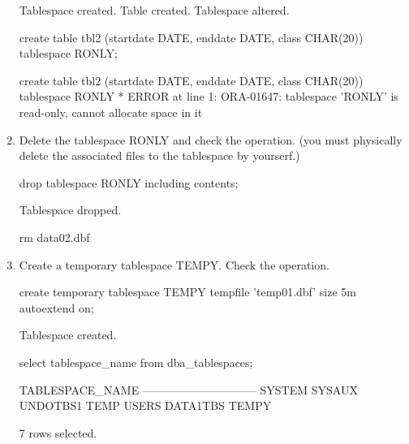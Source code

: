 \documentclass{article}
\begin{document}
\begin{enumerate}
\begin{messageshell}
Tablespace created.
Table created.
Tablespace altered.
\end{messageshell}
\begin{sqlshell}
create table tbl2 (startdate DATE, enddate DATE, class CHAR(20)) tablespace RONLY;
\end{sqlshell}
\begin{messageshell}
create table tbl2 (startdate DATE, enddate DATE, class CHAR(20)) tablespace RONLY
*
ERROR at line 1:
ORA-01647: tablespace 'RONLY' is read-only, cannot allocate space in it

\end{messageshell}
\item{Delete the tablespace RONLY and check the operation. (you must physically delete the associated files to the tablespace by yourserf.)}
\begin{sqlshell}
drop tablespace RONLY including contents;
\end{sqlshell}
\begin{messageshell}

Tablespace dropped.

\end{messageshell}
\begin{commandshell}
rm data02.dbf
\end{commandshell}

\item{Create a temporary tablespace TEMPY. Check the operation.}
\begin{sqlshell}
create temporary tablespace TEMPY tempfile 'temp01.dbf' size 5m autoextend on;
\end{sqlshell}
\begin{messageshell}

Tablespace created.

\end{messageshell}
\begin{sqlshell}
select tablespace_name from dba_tablespaces;
\end{sqlshell}
\begin{messageshell}

TABLESPACE_NAME
------------------------------
SYSTEM
SYSAUX
UNDOTBS1
TEMP
USERS
DATA1TBS
TEMPY

7 rows selected.
\end{messageshell}
\end{enumerate}

\end{document}

